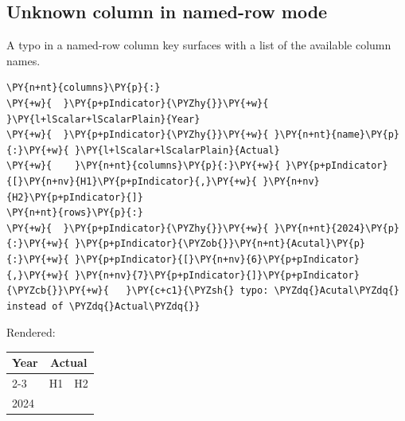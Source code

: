 \documentclass[a4paper,twoside]{article}
\begin{document}
\subsection{Unknown column in named-row mode}
A typo in a named-row column key surfaces with a list of the available
column names.
\begin{tscode}[lang=yaml, engine=pygments]
\begin{Verbatim}[commandchars=\\\{\},breaklines, breakanywhere, commandchars=\\\{\}]
\PY{n+nt}{columns}\PY{p}{:}
\PY{+w}{  }\PY{p+pIndicator}{\PYZhy{}}\PY{+w}{ }\PY{l+lScalar+lScalarPlain}{Year}
\PY{+w}{  }\PY{p+pIndicator}{\PYZhy{}}\PY{+w}{ }\PY{n+nt}{name}\PY{p}{:}\PY{+w}{ }\PY{l+lScalar+lScalarPlain}{Actual}
\PY{+w}{    }\PY{n+nt}{columns}\PY{p}{:}\PY{+w}{ }\PY{p+pIndicator}{[}\PY{n+nv}{H1}\PY{p+pIndicator}{,}\PY{+w}{ }\PY{n+nv}{H2}\PY{p+pIndicator}{]}
\PY{n+nt}{rows}\PY{p}{:}
\PY{+w}{  }\PY{p+pIndicator}{\PYZhy{}}\PY{+w}{ }\PY{n+nt}{2024}\PY{p}{:}\PY{+w}{ }\PY{p+pIndicator}{\PYZob{}}\PY{n+nt}{Acutal}\PY{p}{:}\PY{+w}{ }\PY{p+pIndicator}{[}\PY{n+nv}{6}\PY{p+pIndicator}{,}\PY{+w}{ }\PY{n+nv}{7}\PY{p+pIndicator}{]}\PY{p+pIndicator}{\PYZcb{}}\PY{+w}{   }\PY{c+c1}{\PYZsh{} typo: \PYZdq{}Acutal\PYZdq{} instead of \PYZdq{}Actual\PYZdq{}}
\end{Verbatim}
\end{tscode}
Rendered:
\begin{center}
\begin{tabular}{lll}
\toprule
\multirow{2}{*}{Year} & \multicolumn{2}{c}{Actual} \\
\cmidrule(lr){2-3}
& H1 & H2 \\
\midrule
2024 &  &  \\
\bottomrule
\end{tabular}
\end{center}
\end{document}
